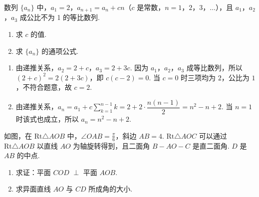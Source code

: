 \begin{problem}
数列 \(\{a_{n}\}\) 中，\(a_{1} = 2\)，\(a_{n + 1} = a_{n} + cn\)（\(c\) 是常数，\(n = 1\)，\(2\)，\(3\)，\(\dots\)），且 \(a_{1}\)，\(a_{2}\)，\(a_{3}\) 成公比不为 1 的等比数列.

\begin{enumerate}
\item 求 \(c\) 的值.
\item 求 \(\{a_{n}\}\) 的通项公式.
\end{enumerate}
\end{problem}

\begin{solution}
\begin{enumerate}
\item 由递推关系，\(a_2=2+c\)，\(a_3=2+3c\). 因为 \(a_1\)，\(a_2\)，\(a_3\) 成等比数列，所以
\((2+c)^2=2(2+3c)\)，即 \(c(c-2)=0\). 当 \(c=0\) 时三项均为 \(2\)，公比为 \(1\)，不符合题意，故 \(c=2\).
\item 由递推关系，\(a_n=a_1+c\sum_{k=1}^{n-1}k=2+2\cdot\dfrac{n(n-1)}2=n^2-n+2\). 当 \(n=1\) 时该式也成立，所以 \(a_n=n^2-n+2\).
\end{enumerate}
\end{solution}

\begin{problem}
如图，在 \(\mathrm{Rt}\triangle AOB\) 中，\(\angle OAB = \frac{\pi}{6}\)，斜边 \(AB = 4\). \(\mathrm{Rt}\triangle AOC\) 可以通过 \(\mathrm{Rt}\triangle AOB\) 以直线 \(AO\) 为轴旋转得到，且二面角 \(B-AO-C\) 是直二面角. \(D\) 是 \(AB\) 的中点.

\begin{enumerate}
\item 求证：平面 \(COD\) \(\perp\) 平面 \(AOB\).
\item 求异面直线 \(AO\) 与 \(CD\) 所成角的大小.
\end{enumerate}

\end{problem}

